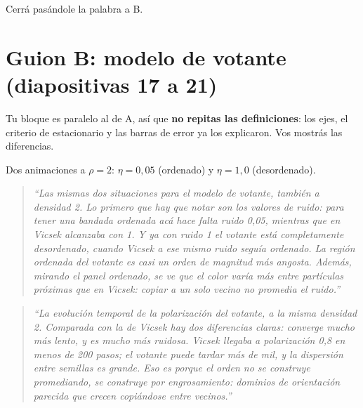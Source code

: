 \documentclass[11pt]{article}
\begin{document}

Cerrá pasándole la palabra a B.

\section{Guion B: modelo de votante (diapositivas 17 a 21)}

Tu bloque es paralelo al de A, así que \textbf{no repitas las definiciones}: los
ejes, el criterio de estacionario y las barras de error ya los explicaron. Vos
mostrás las diferencias.


Dos animaciones a $\rho = 2$: $\eta = 0{,}05$ (ordenado) y $\eta = 1{,}0$
(desordenado).

\begin{quote}
\itshape
``Las mismas dos situaciones para el modelo de votante, también a densidad 2.
Lo primero que hay que notar son los valores de ruido: para tener una bandada
ordenada acá hace falta ruido 0,05, mientras que en Vicsek alcanzaba con 1. Y ya
con ruido 1 el votante está completamente desordenado, cuando Vicsek a ese
mismo ruido seguía ordenado. La región ordenada del votante es casi un orden de
magnitud más angosta. Además, mirando el panel ordenado, se ve que el color
varía más entre partículas próximas que en Vicsek: copiar a un solo vecino no
promedia el ruido.''
\end{quote}



\begin{quote}
\itshape
``La evolución temporal de la polarización del votante, a la misma densidad 2.
Comparada con la de Vicsek hay dos diferencias claras: converge mucho más lento,
y es mucho más ruidosa. Vicsek llegaba a polarización 0,8 en menos de 200 pasos;
el votante puede tardar más de mil, y la dispersión entre semillas es grande.
Eso es porque el orden no se construye promediando, se construye por
engrosamiento: dominios de orientación parecida que crecen copiándose entre
vecinos.''
\end{quote}
\end{document}
